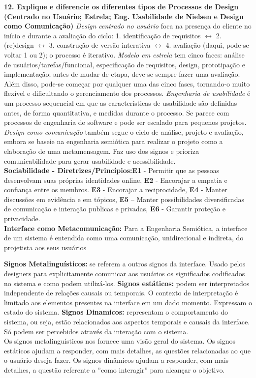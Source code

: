 \documentclass[9pt, twocolumn, article]{memoir}
\begin{document}
\textbf{12. Explique e diferencie os diferentes tipos de  Processos de Design (Centrado no Usuário; Estrela; Eng. Usabilidade de Nielsen e Design como Comunicação)}
\emph{Design centrado no usuário} foca na presença do cliente no início e durante a avaliação do ciclo: 1. identificação de requisitos $\leftrightarrow$ 2. (re)design $\leftrightarrow$ 3. construção de versão interativa $\leftrightarrow$ 4. avaliação (daqui, pode-se voltar 1 ou 2); o processo é iterativo. \emph{Modelo em estrela} tem cinco faces: análise de usuários/tarefas/funcional, especificação de requisitos, design, prototipação e implementação; antes de mudar de etapa, deve-se sempre fazer uma avaliação. Além disso, pode-se começar por qualquer uma das cinco fases, tornando-o muito flexível e dificultando o gerenciamento dos processos. \emph{Engenharia de usabilidade} é um processo sequencial em que as características de usabilidade são definidas antes, de forma quantitativa, e medidas durante o processo. Se parece com processos de engenharia de software e pode ser escalado para pequenos projetos. \emph{Design como comunicação} também segue o ciclo de análise, projeto e avaliação, embora se baseie na engenharia semiótica para realizar o projeto como a elaboração de uma metamensagem. Faz uso dos signos e prioriza comunicabilidade para gerar usabilidade e acessibilidade.\\

\textbf{Sociabilidade - Diretrizes/Princípios:}\textbf{E1} - Permitir que as pessoas desenvolvam suas próprias identidades
online,
\textbf{E2 }- Encorajar a empatia e confiança entre os membros. 
\textbf{E3 }- Encorajar a reciprocidade, 
\textbf{E4 }- Manter discussões em evidência e em tópicos, 
\textbf{E5 }– Manter possibilidades diversificadas de comunicação e interação publicas e privadas, 
\textbf{E6 }- Garantir proteção e privacidade.\\

\textbf{Interface como Metacomunicação:} Para a Engenharia Semiótica, a interface de um sistema é entendida como uma comunicação, unidirecional e indireta, do projetista aos
seus usuários

\textbf{Signos Metalinguísticos:} se referem a outros signos da interface. Usado pelos designers para explicitamente comunicar aos usuários os significados codificados no sistema e como podem utilizá-los.
\textbf{Signos estáticos:} podem ser interpretados independente de relações causais ou temporais. O contexto de interpretação é limitado aos elementos presentes na interface em um dado momento. Expressam o estado do sistema.
\textbf{Signos Dinamicos:} representam o comportamento do sistema, ou seja, estão relacionados aos aspectos temporais e causais da interface. Só podem ser percebidos através da interação com o
sistema. \\
Os signos metalinguísticos nos fornece uma visão geral do sistema. Os signos estáticos ajudam a responder, com mais detalhes, as questões relacionadas ao que o usuário deseja fazer. Os signos dinâmicos ajudam a responder, com mais detalhes, a questão referente a ”como interagir” para alcançar o objetivo.
\end{document}
